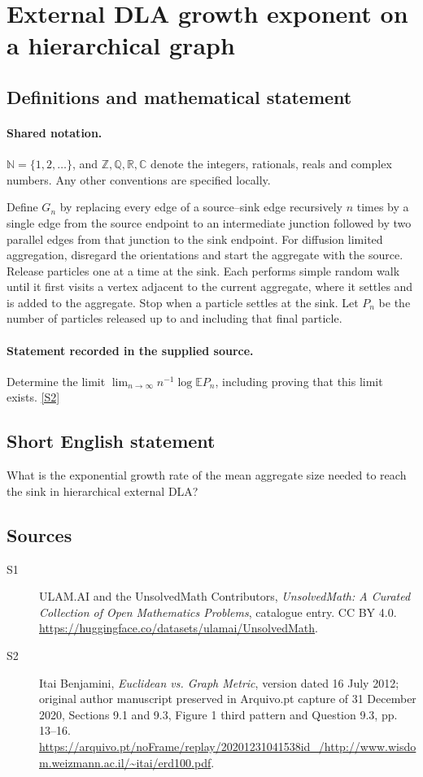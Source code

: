 \documentclass[11pt]{article}
\newcommand{\sref}[2]{\hyperlink{source:#1:#2}{[S#2]}}
\begin{document}
\section{External DLA growth exponent on a hierarchical graph}\label{statement}

\subsection{Definitions and mathematical statement}

\paragraph{Shared notation.}$\mathbb N=\{1,2,\ldots\}$, and $\mathbb Z,\mathbb Q,\mathbb R,\mathbb C$ denote the integers, rationals, reals and complex numbers. Any other conventions are specified locally.


Define $G_n$ by replacing every edge of a source--sink edge recursively $n$ times by a single edge from the source endpoint to an intermediate junction followed by two parallel edges from that junction to the sink endpoint. For diffusion limited aggregation, disregard the orientations and start the aggregate with the source. Release particles one at a time at the sink. Each performs simple random walk until it first visits a vertex adjacent to the current aggregate, where it settles and is added to the aggregate. Stop when a particle settles at the sink. Let $P_n$ be the number of particles released up to and including that final particle.
\paragraph{Statement recorded in the supplied source.}
Determine the limit $\lim_{n\to\infty}n^{-1}\log\mathbb E P_n$, including proving that this limit exists. \sref{statement}{2}
\subsection{Short English statement}
What is the exponential growth rate of the mean aggregate size needed to reach the sink in hierarchical external DLA?
\subsection{Sources}
\begin{description}
\item[\hypertarget{source:statement:1}{S1}] ULAM.AI and the UnsolvedMath Contributors, \emph{UnsolvedMath: A Curated Collection of Open Mathematics Problems}, catalogue entry. CC BY 4.0. \url{https://huggingface.co/datasets/ulamai/UnsolvedMath}.
\item[\hypertarget{source:statement:2}{S2}] Itai Benjamini, \emph{Euclidean vs. Graph Metric}, version dated 16 July 2012; original author manuscript preserved in Arquivo.pt capture of 31 December 2020, Sections 9.1 and 9.3, Figure 1 third pattern and Question 9.3, pp. 13--16. \url{https://arquivo.pt/noFrame/replay/20201231041538id_/http://www.wisdom.weizmann.ac.il/~itai/erd100.pdf}.
\end{description}
\label{end:statement}
\end{document}
